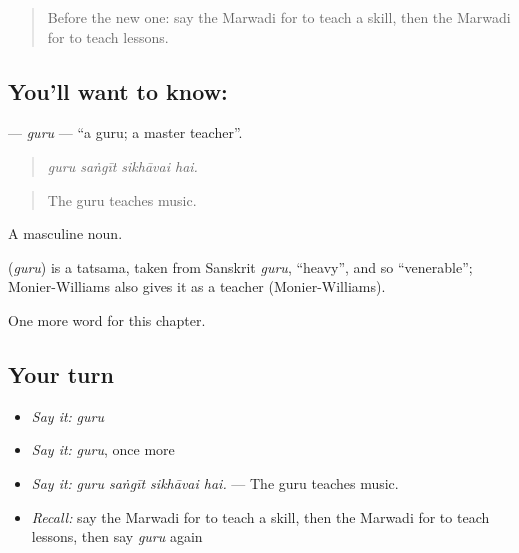\label{lesson:MW-C287-guru}



\begin{quote}
Before the new one: say the Marwadi for to teach a skill, then the Marwadi for to teach lessons.
\end{quote}

\subsection*{You'll want to know: }
\textbf{} — \emph{guru} — \textquotedblleft{}a guru; a master teacher\textquotedblright{}.

\begin{quote}
   
\end{quote}

\begin{quote}
\emph{guru saṅgīt sikhāvai hai.}
\end{quote}

\begin{quote}
The guru teaches music.
\end{quote}

A masculine noun.

\begin{cousinweb}
\textbf{} (\emph{guru}) is a tatsama, taken from Sanskrit \emph{guru}, \textquotedblleft{}heavy\textquotedblright{}, and so \textquotedblleft{}venerable\textquotedblright{}; Monier-Williams also gives it as a teacher (Monier-Williams).
\end{cousinweb}

\begin{grammarlens}[title={What you've built}]
One more word for this chapter.
\end{grammarlens}

\subsection*{Your turn}
\begin{itemize}
\raggedright
  \item \emph{Say it:} \emph{guru}
  \item \emph{Say it:} \emph{guru}, once more
  \item \emph{Say it:} \emph{guru saṅgīt sikhāvai hai.} — The guru teaches music.
  \item \emph{Recall:} say the Marwadi for to teach a skill, then the Marwadi for to teach lessons, then say \emph{guru} again
\end{itemize}

